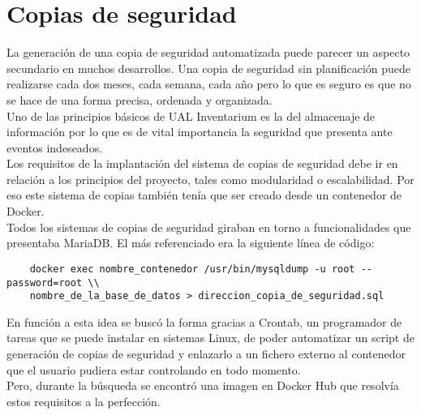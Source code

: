 \section{Copias de seguridad}
La generación de una copia de seguridad automatizada puede parecer un aspecto secundario en muchos desarrollos. Una copia de seguridad sin planificación puede realizarse cada dos meses, cada semana, cada año pero lo que es seguro es que no se hace de una forma precisa, ordenada y organizada.
\\Uno de las principios básicos de UAL Inventarium es la del almacenaje de información por lo que es de vital importancia la seguridad que presenta ante eventos indeseados.
\\Los requisitos de la implantación del sistema de copias de seguridad debe ir en relación a los principios del proyecto, tales como modularidad o escalabilidad. Por eso este sistema de copias también tenía que ser creado desde un contenedor de Docker.
\\Todos los sistemas de copias de seguridad giraban en torno a funcionalidades que presentaba MariaDB. El más referenciado era la siguiente línea de código:
\begin{verbatim}
    docker exec nombre_contenedor /usr/bin/mysqldump -u root --password=root \\
    nombre_de_la_base_de_datos > direccion_copia_de_seguridad.sql
\end{verbatim}
En función a esta idea se buscó la forma gracias a Crontab, un programador de tareas que se puede instalar en sistemas Linux, de poder automatizar un script de generación de copias de seguridad y enlazarlo a un fichero externo al contenedor que el usuario pudiera estar controlando en todo momento.
\\Pero, durante la búsqueda se encontró una imagen en Docker Hub que resolvía estos requisitos a la perfección.

